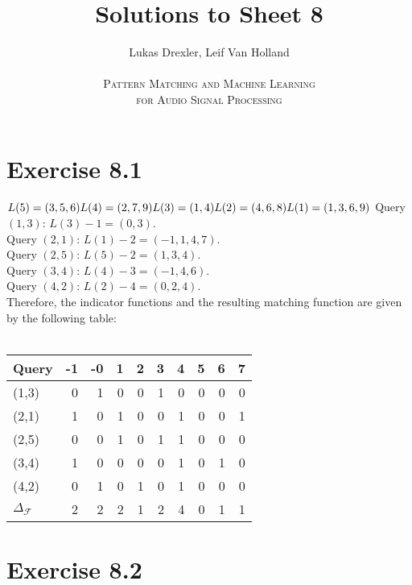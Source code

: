 \documentclass[12pt]{article}
\begin{document}
\title{Solutions to Sheet 8}
\author{Lukas Drexler, Leif Van Holland \\ \\
\textsc{Pattern Matching and Machine Learning} \\
\textsc{for Audio Signal Processing}}
\maketitle

\section*{Exercise 8.1}
$
L(5) = (3,5,6)\\
L(4) = (2,7,9)\\
L(3) = (1,4)\\
L(2) = (4,6,8)\\
L(1) = (1,3,6,9)\\
$
Query $(1,3)$: $L(3)-1 = (0,3)$.\\
Query $(2,1)$: $L(1)-2 = (-1,1,4,7)$.\\
Query $(2,5)$: $L(5)-2 = (1,3,4)$.\\
Query $(3,4)$: $L(4)-3 = (-1,4,6)$.\\
Query $(4,2)$: $L(2)-4 = (0,2,4)$.\\
Therefore, the indicator functions and the resulting matching function are given by the following table:\\ \\
\begin{tabular}{|l|*{9}{|r}|}\hline
\bfseries Query & \bfseries -1 & \bfseries -0 & \bfseries 1 & \bfseries 2 & \bfseries 3 & \bfseries 4 & \bfseries 5 & \bfseries 6 & \bfseries 7\\ \hline\hline
(1,3) & 0 & 1 & 0 & 0 & 1 & 0 & 0 & 0 & 0\\
(2,1) & 1 & 0 & 1 & 0 & 0 & 1 & 0 & 0 & 1\\
(2,5) & 0 & 0 & 1 & 0 & 1 & 1 & 0 & 0 & 0\\
(3,4) & 1 & 0 & 0 & 0 & 0 & 1 & 0 & 1 & 0\\
(4,2) & 0 & 1 & 0 & 1 & 0 & 1 & 0 & 0 & 0\\ \hline\hline
$\Delta_{\mathcal{F}}$ & 2 & 2 & 2 & 1 & 2 & 4 & 0 & 1 & 1\\\hline
\end{tabular}

\section*{Exercise 8.2}
\end{document}
